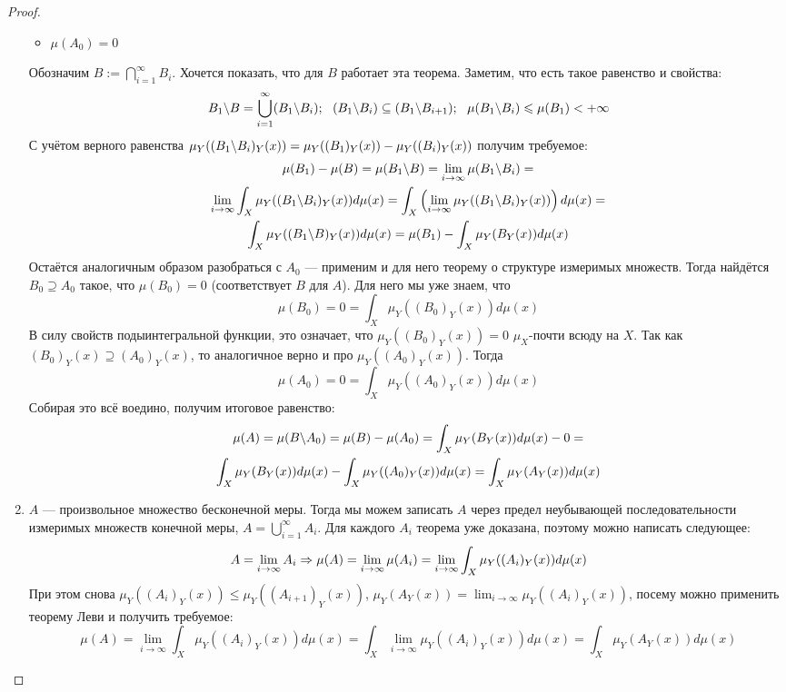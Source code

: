 \begin{proof}
\begin{enumerate}
\begin{itemize}
			\item $\mu(A_0) = 0$
		\end{itemize}
		Обозначим $B := \bigcap_{i = 1}^\infty B_i$. Хочется показать, что для $B$ работает эта теорема. Заметим, что есть такое равенство и свойства:
		\[
			B_1 \backslash B = \bigcup_{i = 1}^\infty (B_1 \backslash B_i);\ \ (B_1 \backslash B_i) \subseteq (B_1 \backslash B_{i + 1});\ \ \mu(B_1 \backslash B_i) \leqslant \mu(B_1) < +\infty
		\]
		С учётом верного равенства $\mu_Y((B_1 \backslash B_i)_Y(x)) = \mu_Y((B_1)_Y(x)) - \mu_Y((B_i)_Y(x))$ получим требуемое:
		\begin{multline*}
			\mu(B_1) - \mu(B) = \mu(B_1 \backslash B) = \lim_{i \to \infty} \mu(B_1 \backslash B_i) =
			\\
			\lim_{i \to \infty} \int_X \mu_Y((B_1 \backslash B_i)_Y(x))d\mu(x) = \int_X \left(\lim_{i \to \infty} \mu_Y((B_1 \backslash B_i)_Y(x))\right)d\mu(x) =
			\\
			\int_X \mu_Y((B_1 \backslash B)_Y(x))d\mu(x) = \mu(B_1) - \int_X \mu_Y(B_Y(x))d\mu(x)
		\end{multline*}
		Остаётся аналогичным образом разобраться с $A_0$ --- применим и для него теорему о структуре измеримых множеств. Тогда найдётся $B_0 \supseteq A_0$ такое, что $\mu(B_0) = 0$ (соответствует $B$ для $A$). Для него мы уже знаем, что
		\[
			\mu(B_0) = 0 = \int_X \mu_Y((B_0)_Y(x))d\mu(x)
		\]
		В силу свойств подыинтегральной функции, это означает, что $\mu_Y((B_0)_Y(x)) = 0$ $\mu_X$-почти всюду на $X$. Так как $(B_0)_Y(x) \supseteq (A_0)_Y(x)$, то аналогичное верно и про $\mu_Y((A_0)_Y(x))$. Тогда
		\[
			\mu(A_0) = 0 = \int_X \mu_Y((A_0)_Y(x))d\mu(x)
		\]
		Собирая это всё воедино, получим итоговое равенство:
		\begin{multline*}
			\mu(A) = \mu(B \backslash A_0) = \mu(B) - \mu(A_0) = \int_X \mu_Y(B_Y(x))d\mu(x) - 0 =
			\\
			\int_X \mu_Y(B_Y(x))d\mu(x) - \int_X \mu_Y((A_0)_Y(x))d\mu(x) = \int_X \mu_Y(A_Y(x))d\mu(x)
		\end{multline*}
		
		\item $A$ --- произвольное множество бесконечной меры. Тогда мы можем записать $A$ через предел неубывающей последовательности измеримых множеств конечной меры, $A = \bigcup_{i = 1}^\infty A_i$. Для каждого $A_i$ теорема уже доказана, поэтому можно написать следующее:
		\[
			A = \lim_{i \to \infty} A_i \Rightarrow \mu(A) = \lim_{i \to \infty} \mu(A_i) = \lim_{i \to \infty} \int_X \mu_Y((A_i)_Y(x))d\mu(x)
		\]
		При этом снова $\mu_Y((A_i)_Y(x)) \le \mu_Y((A_{i + 1})_Y(x))$, $\mu_Y(A_Y(x)) = \lim_{i \to \infty} \mu_Y((A_i)_Y(x))$, посему можно применить теорему Леви и получить требуемое:
		\[
			\mu(A) = \lim_{i \to \infty} \int_X \mu_Y((A_i)_Y(x))d\mu(x) = \int_X \lim_{i \to \infty} \mu_Y((A_i)_Y(x))d\mu(x) = \int_X \mu_Y(A_Y(x))d\mu(x)
		\]
	\end{enumerate}
\end{proof}

